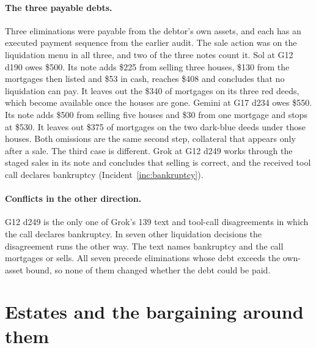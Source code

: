 \paragraph{The three payable debts.} Three eliminations were payable from the debtor's own assets, and each has an executed payment sequence from the earlier audit. The sale action was on the liquidation menu in all three, and two of the three notes count it. Sol at G12 d190 owes \$500. Its note adds \$225 from selling three houses, \$130 from the mortgages then listed and \$53 in cash, reaches \$408 and concludes that no liquidation can pay. It leaves out the \$340 of mortgages on its three red deeds, which become available once the houses are gone. Gemini at G17 d234 owes \$550. Its note adds \$500 from selling five houses and \$30 from one mortgage and stops at \$530. It leaves out \$375 of mortgages on the two dark-blue deeds under those houses. Both omissions are the same second step, collateral that appears only after a sale. The third case is different. Grok at G12 d249 works through the staged sales in its note and concludes that selling is correct, and the received tool call declares bankruptcy (Incident~\ref{inc:bankruptcy}).

\paragraph{Conflicts in the other direction.} G12 d249 is the only one of Grok's 139 text and tool-call disagreements in which the call declares bankruptcy. In seven other liquidation decisions the disagreement runs the other way. The text names bankruptcy and the call mortgages or sells. All seven precede eliminations whose debt exceeds the own-asset bound, so none of them changed whether the debt could be paid.


\section{Estates and the bargaining around them}
\label{sec:inheritance}

